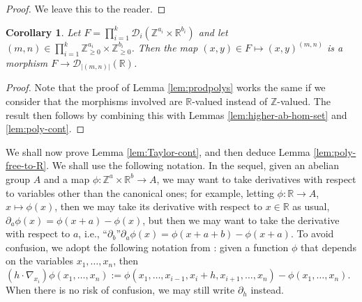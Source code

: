 \documentclass[a4paper,12pt,reqno]{amsart}
\newtheorem{corollary}[theorem]{Corollary}
\theoremstyle{definition}
\def\to{\rightarrow}
\newcommand{\mc}{\mathcal}
\newcommand{\mb}{\mathbb}
\begin{document}
\begin{proof}
We leave this to the reader.
\end{proof}

\begin{corollary}\label{cor:cont-binom-poly}
Let $F=\prod_{i=1}^k \mc{D}_i(\mb{Z}^{a_i}\times \mb{R}^{b_i})$ and let $(m,n)\in \prod_{i=1}^k \mb{Z}_{\ge 0}^{a_i}\times \mb{Z}_{\ge 0}^{b_i}$. Then the map $(x,y)\in F\mapsto (x,y)^{(m,n)}$ is a morphism $F\to \mc{D}_{|(m,n)|}(\mb{R})$.
\end{corollary}

\begin{proof}
Note that the proof of Lemma \ref{lem:prodpolys} works the same if we consider that the morphisms involved are $\mb{R}$-valued instead of $\mb{Z}$-valued. The result then follows by combining this with Lemmas \ref{lem:higher-ab-hom-set} and \ref{lem:poly-cont}.
\end{proof}
\noindent We shall now prove Lemma \ref{lem:Taylor-cont}, and then deduce Lemma \ref{lem:poly-free-to-R}. We shall use the following notation. In the sequel, given an abelian group $A$ and a map $\phi:\mb{Z}^a\times \mb{R}^b\to A$, we may want to take derivatives with respect to variables other than the canonical ones; for example, letting $\phi:\mb{R}\to A$, $x\mapsto \phi(x)$, then we may take its derivative with respect to $x\in \mb{R}$ as usual, $\partial_a\phi(x)=\phi(x+a)-\phi(x)$, but then we may want to take the derivative with respect to  $a$, i.e., $\text{``}\partial_b\text{''}\partial_a\phi(x)=\phi(x+a+b)-\phi(x+a)$. To avoid confusion, we adopt the following notation from \cite{GT08}: given a function $\phi$ that depends on the variables $x_1,\ldots,x_n$, then $(h\cdot \nabla_{x_i})\phi(x_1,\ldots,x_n):=\phi(x_1,\ldots,x_{i-1},x_i+h,x_{i+1},\ldots,x_n)-\phi(x_1,\ldots,x_n)$. When there is no risk of confusion, we may still write $\partial_{h}$ instead.
\end{document}
